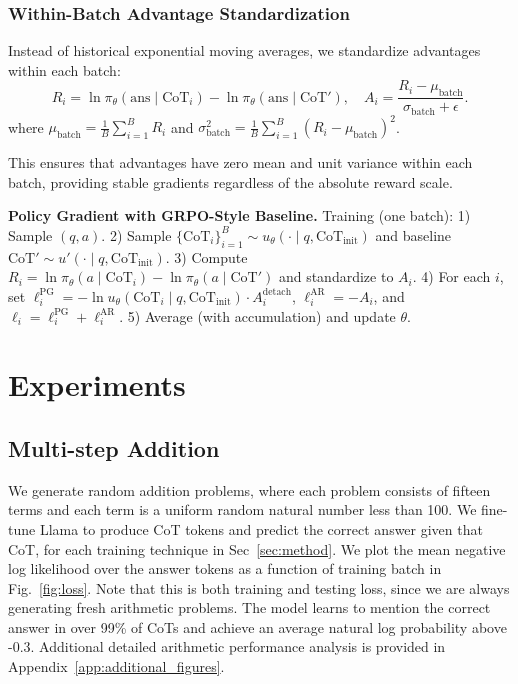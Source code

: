 \documentclass{article} %
\begin{document}
\subsubsection{Within-Batch Advantage Standardization}
Instead of historical exponential moving averages, we standardize advantages within each batch:
\[R_i=\ln \pi_\theta(\text{ans} \mid \text{CoT}_i) - \ln \pi_\theta(\text{ans} \mid \text{CoT}'),\quad
A_i=\frac{R_i - \mu_{\text{batch}}}{\sigma_{\text{batch}} + \epsilon}.\]
where $\mu_{\text{batch}} = \frac{1}{B}\sum_{i=1}^B R_i$ and $\sigma_{\text{batch}}^2 = \frac{1}{B}\sum_{i=1}^B (R_i - \mu_{\text{batch}})^2$.

This ensures that advantages have zero mean and unit variance within each batch, providing stable gradients regardless of the absolute reward scale.

\noindent\textbf{Policy Gradient with GRPO-Style Baseline.} Training (one batch): 1) Sample $(q,a)$. 2) Sample $\{\text{CoT}_i\}_{i=1}^B\sim u_\theta(\cdot\mid q,\text{CoT}_{\text{init}})$ and baseline $\text{CoT}'\sim u'(\cdot\mid q,\text{CoT}_{\text{init}})$. 3) Compute $R_i=\ln \pi_\theta(a\mid \text{CoT}_i)-\ln \pi_\theta(a\mid \text{CoT}')$ and standardize to $A_i$. 4) For each $i$, set $\ell_i^{\text{PG}}=-\ln u_\theta(\text{CoT}_i\mid q,\text{CoT}_{\text{init}})\cdot A_i^{\text{detach}}$, $\ell_i^{\text{AR}}=-A_i$, and $\ell_i=\ell_i^{\text{PG}}+\ell_i^{\text{AR}}$. 5) Average (with accumulation) and update $\theta$.



\section{Experiments}
\label{sec:experiments}


\subsection{Multi-step Addition}
\label{subsec:solving}
We generate random addition problems, where each problem consists of fifteen terms and each term is a uniform random natural number less than 100. We fine-tune Llama to produce CoT tokens and predict the correct answer given that CoT, for each training technique in Sec~\ref{sec:method}. We plot the mean negative log likelihood over the answer tokens as a function of training batch in Fig.~\ref{fig:loss}. Note that this is both training and testing loss, since we are always generating fresh arithmetic problems. The model learns to mention the correct answer in over 99\% of CoTs and achieve an average natural log probability above -0.3. Additional detailed arithmetic performance analysis is provided in Appendix~\ref{app:additional_figures}. 
\end{document}
